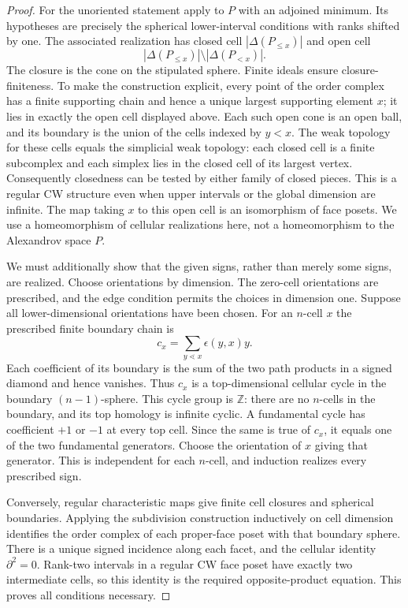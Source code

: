 \begin{proof}
For the unoriented statement apply \citet[Definition~2.1, p.~8;
Proposition~3.1, p.~11]{Bjorner1984} to $P$ with an adjoined minimum.
Its hypotheses are precisely the spherical lower-interval conditions
with ranks shifted by one. The associated realization has closed cell
$|\Delta(P_{\le x})|$ and open cell
\[
 |\Delta(P_{\le x})|\setminus |\Delta(P_{<x})|.
\]
The closure is the cone on the stipulated sphere. Finite ideals ensure
closure-finiteness. To make the construction explicit, every point of
the order complex has a finite supporting chain and hence a unique
largest supporting element $x$; it lies in exactly the open cell
displayed above. Each such open cone is an open ball, and its boundary
is the union of the cells indexed by $y<x$. The weak topology for these
cells equals the simplicial weak topology: each closed cell is a finite
subcomplex and each simplex lies in the closed cell of its largest
vertex. Consequently closedness can be tested by either family of
closed pieces. This is a regular CW structure even when upper intervals
or the global dimension are infinite. The map taking
$x$ to this open cell is an isomorphism of face posets. We use a
homeomorphism of cellular realizations here, not a homeomorphism to
the Alexandrov space $P$.

We must additionally show that the given signs, rather than merely
some signs, are realized. Choose orientations by dimension. The
zero-cell orientations are prescribed, and the edge condition permits
the choices in dimension one. Suppose all lower-dimensional orientations
have been chosen. For an $n$-cell $x$ the prescribed finite boundary chain
is
\[
 c_x=\sum_{y\lessdot x}\epsilon(y,x)y.
\]
Each coefficient of its boundary is the sum of the two path products
in a signed diamond and hence vanishes. Thus $c_x$ is a top-dimensional
cellular cycle in the boundary $(n-1)$-sphere. This cycle group is
$\mathbb Z$: there are no $n$-cells in the boundary, and its top homology
is infinite cyclic. A fundamental cycle has coefficient $+1$ or $-1$
at every top cell. Since the same is true of $c_x$, it equals one of
the two fundamental generators. Choose the orientation of $x$ giving
that generator. This is independent for each $n$-cell, and induction
realizes every prescribed sign.

Conversely, regular characteristic maps give finite cell closures and
spherical boundaries. Applying the subdivision construction inductively
on cell dimension identifies the order complex of each proper-face
poset with that boundary sphere. There is a unique signed incidence
along each facet,
and the cellular identity $\partial^2=0$. Rank-two intervals in a
regular CW face poset have exactly two intermediate cells, so this
identity is the required opposite-product equation. This proves all
conditions necessary.
\end{proof}


